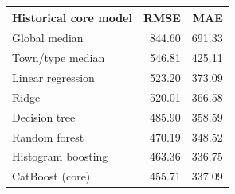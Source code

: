 \begin{tabular}{lrr}
\toprule
Historical core model & RMSE & MAE \\
\midrule
Global median & 844.60 & 691.33 \\
Town/type median & 546.81 & 425.11 \\
Linear regression & 523.20 & 373.09 \\
Ridge & 520.01 & 366.58 \\
Decision tree & 485.90 & 358.59 \\
Random forest & 470.19 & 348.52 \\
Histogram boosting & 463.36 & 336.75 \\
CatBoost (core) & 455.71 & 337.09 \\
\bottomrule
\end{tabular}
